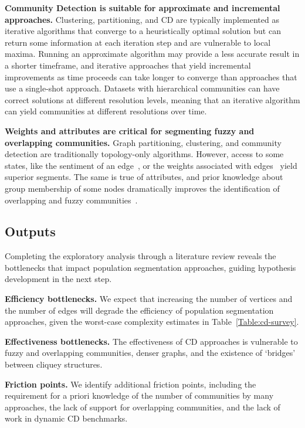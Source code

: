 \textbf{Community Detection is suitable for approximate and incremental approaches.}
Clustering, partitioning, and \ac{CD} are typically implemented as iterative algorithms that converge to a heuristically optimal solution but can return some information at each iteration step and are vulnerable to local maxima.
Running an approximate algorithm may provide a less accurate result in a shorter timeframe, and iterative approaches that yield incremental improvements as time proceeds can take longer to converge than approaches that use a single-shot approach.
Datasets with hierarchical communities can have correct solutions at different resolution levels, meaning that an iterative algorithm can yield communities at different resolutions over time. 

\textbf{Weights and attributes are critical for segmenting fuzzy and overlapping communities.} 
Graph partitioning, clustering, and community detection are traditionally topology-only algorithms. 
However, access to some states, like the sentiment of an edge~\cite{Yang2007}, or the weights associated with edges~\cite{Rosvall2008} yield superior segments. 
The same is true of attributes, and prior knowledge about group membership of some nodes dramatically improves the identification of overlapping and fuzzy communities~\cite{Zhang2013}. 

\subsection{Outputs}
Completing the exploratory analysis through a literature review reveals the bottlenecks that impact population segmentation approaches, guiding hypothesis development in the next step. 

\textbf{Efficiency bottlenecks.}
We expect that increasing the number of vertices and the number of edges will degrade the efficiency of population segmentation approaches, given the worst-case complexity estimates in  Table~\ref{Table:cd-survey}.

\textbf{Effectiveness bottlenecks.} 
The effectiveness of \ac{CD} approaches is vulnerable to fuzzy and overlapping communities, denser graphs, and the existence of `bridges' between cliquey structures.

\textbf{Friction points.} 
We identify additional friction points, including the requirement for a priori knowledge of the number of communities by many approaches, the lack of support for overlapping communities, and the lack of work in dynamic \ac{CD} benchmarks.

